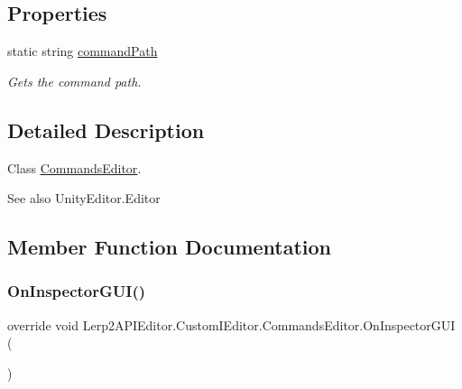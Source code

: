 \subsection*{Properties}
\begin{DoxyCompactItemize}
\item 
static string \hyperlink{class_lerp2_a_p_i_editor_1_1_custom_i_editor_1_1_commands_editor_ac3323fe8f20022d9df929d3a299a7287}{command\+Path}
\begin{DoxyCompactList}\small\item\em Gets the command path. \end{DoxyCompactList}\end{DoxyCompactItemize}


\subsection{Detailed Description}
Class \hyperlink{class_lerp2_a_p_i_editor_1_1_custom_i_editor_1_1_commands_editor}{Commands\+Editor}. 

\begin{DoxySeeAlso}{See also}
Unity\+Editor.\+Editor


\end{DoxySeeAlso}


\subsection{Member Function Documentation}
\mbox{\label{class_lerp2_a_p_i_editor_1_1_custom_i_editor_1_1_commands_editor_a57aa4aadb86cb1eb731540617b2e8ca4}} 
\subsubsection{\texorpdfstring{On\+Inspector\+G\+U\+I()}{OnInspectorGUI()}}
{\footnotesize\ttfamily override void Lerp2\+A\+P\+I\+Editor.\+Custom\+I\+Editor.\+Commands\+Editor.\+On\+Inspector\+G\+UI (\begin{DoxyParamCaption}{ }\end{DoxyParamCaption})\hspace{0.3cm}{\ttfamily [inline]}}



